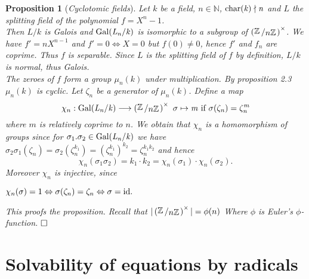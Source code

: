 \documentclass[11pt]{book}
\newtheorem{proposition}[theorem]{Proposition}
\theoremstyle{nonumberbreak}
\newenvironment{pr}[1][]{\ifthenelse{\equal{#1}{}}{\proof}{\proof[#1]}\rm}{\endproof}
\newcommand{\slant}[2]{{\raisebox{.1em}{$#1$}\left/\raisebox{-.1em}{$#2$}\right.}}
\begin{document}
\begin{spacing}{1.3}
\begin{proposition}[\rm \it Cyclotomic fields]   %
Let $k$ be a field, $n \in \mathbb{N}$, $\rm{char}\it(k) \nmid n$ and $L$ the splitting field of the polynomial $f=X^n-1$.\\
Then $L/k$ is Galois and $\rm{Gal}\it(L_n/k)$ is isomorphic to a subgroup of $\left(\slant{\mathbb{Z}}{n \mathbb{Z}}\right)^{\times}$.
\begin{pr}
We have $f'=n X^{n-1}$ and $f'=0 \Leftrightarrow X=0$ but $f(0)\neq 0$, hence $f'$ and $f_n$ are coprime. Thus $f$ is separable. Since $L$ is the splitting field of $f$ by definition, $L/k$ is normal, thus Galois.\\
The zeroes of $f$ form a group $\mu_n(k)$ under multiplication. By proposition 2.3 $\mu_n(k)$ is cyclic. Let $\zeta_n$ be a generator of $\mu_n(k)$. Define a map
$$ \chi_n: \gal(L_n/k) \longrightarrow \left(\slant{\mathbb{Z}}{n \mathbb{Z}}\right)^{\times}\textrm{ }\sigma \mapsto m\textrm{ if }\sigma(\zeta_n)=\zeta_n^m$$
where $m$ is relatively coprime to $n$. We obtain that $\chi_n$ is a homomorphism of groups since for $\sigma_1. \sigma_2 \in \rm{Gal}\it(L_n/k)$ we have $ \sigma_2 \sigma_1(\zeta_n)=\sigma_2 \left(\zeta_n^{k_1}\right)=\left(\zeta_n^{k_1}\right)^{k_2}=\zeta_n^{k_1 k_2}$
and hence 
$$ \chi_n \left( \sigma_1 \sigma_2 \right)=k_1 \cdot k_2 = \chi_n(\sigma_1) \cdot \chi_n(\sigma_2).$$
Moreover $\chi_n$ is injective, since
\begin{center}$ \chi_n(\sigma)=1 \Leftrightarrow \sigma(\zeta_n)= \zeta_n \Leftrightarrow \sigma= \rm{id}.$\end{center}
This proofs the proposition. Recall that $\vert \left( \slant{\mathbb{Z}}{n \mathbb{Z}}\right)^{\times} \vert = \phi(n)$ Where $\phi$ is Euler's $\phi$-function. $\hfill \Box$
\end{pr}
\end{proposition}



\renewcommand*\thesection{§ \arabic{section}\quad}
\section{Solvability of equations by radicals}
\renewcommand*\thesection{\arabic{section}}


\end{spacing}
\end{document}
